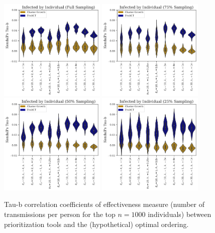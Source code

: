 \documentclass[a4paper,11pt]{article}
\begin{document}
\clearpage

\begin{figure}[!h]
\centering
\includegraphics[width=0.45\textwidth]{figs/results_efficacy_tau_individual.pdf}
\includegraphics[width=0.45\textwidth]{figs/results_efficacy_tau_individual_sub75.pdf}\\
\includegraphics[width=0.45\textwidth]{figs/results_efficacy_tau_individual_sub50.pdf}
\includegraphics[width=0.45\textwidth]{figs/results_efficacy_tau_individual_sub25.pdf}\\
\caption{Tau-b correlation coefficients of effectiveness measure (number of transmissions per person for the top $n=1000$ individuals) between prioritization tools and the (hypothetical) optimal ordering.}\label{fig:tau-b-values}
\end{figure}
\end{document}
